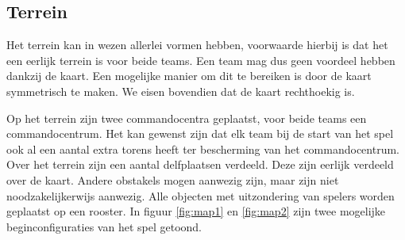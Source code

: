 \subsection{Terrein}
Het terrein kan in wezen allerlei vormen hebben, voorwaarde hierbij is dat het een eerlijk terrein is voor beide teams. Een team mag dus geen voordeel hebben dankzij de kaart. Een mogelijke manier om dit te bereiken is door de kaart symmetrisch te maken. We eisen bovendien dat de kaart rechthoekig is.

Op het terrein zijn twee commandocentra geplaatst, voor beide teams een commandocentrum. Het kan gewenst zijn dat elk team bij de start van het spel ook al een aantal extra torens heeft ter bescherming van het commandocentrum. Over het terrein zijn een aantal delfplaatsen verdeeld. Deze zijn eerlijk verdeeld over de kaart. Andere obstakels mogen aanwezig zijn, maar zijn niet noodzakelijkerwijs aanwezig. Alle objecten met uitzondering van spelers worden geplaatst op een rooster. In figuur \ref{fig:map1} en \ref{fig:map2} zijn twee mogelijke beginconfiguraties van het spel getoond.
